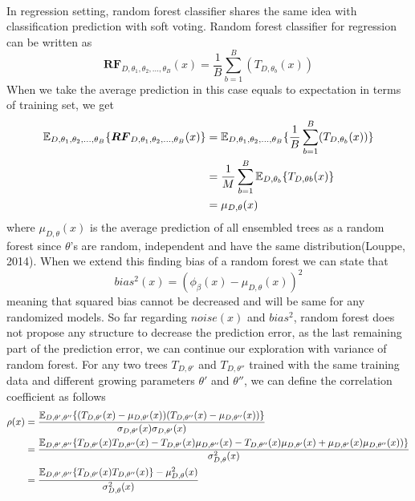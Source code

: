 \paragraph{}
In regression setting, random forest classifier shares the same idea with classification prediction with soft voting. Random forest classifier for regression can be written as
\begin{equation}
\boldsymbol{RF}_{D, \theta_{1},\theta_{2},..., \theta_{B}}(x) = \dfrac{1}{B}\sum_{b = 1}^{B}(T_{D,\theta_{b}}(x))
\end{equation}
When we take the average prediction in this case equals to expectation in terms of training set, we get
\begin{align}
\mathbb{E}_{D, \theta_{1}, \theta_{2},..., \theta_{B}}\{\boldsymbol{RF}_{D, \theta_{1},\theta_{2},..., \theta_{B}}(x) \} & = 
	\mathbb{E}_{D, \theta_{1}, \theta_{2},..., \theta_{B}}\{\dfrac{1}{B}\sum_{b = 1}^{B}(T_{D,\theta_{b}}(x))\} \notag \\
	& = \dfrac{1}{M}\sum_{b=1}^{B}\mathbb{E}_{D,\theta_{b}}\{T_{D, \theta{b}}(x)\}\notag \\
	& = \mu_{D,\theta}(x) 
\end{align}
where $\mu_{D,\theta}(x)$ is the average prediction of all ensembled trees as a random forest since $\theta$'s are random, independent
and have the same distribution(Louppe, 2014). When we extend this finding bias of a random forest we can state that 
\begin{equation}
bias^2(x) = (\phi_{\beta}(x) - \mu_{D,\theta}(x))^2
\end{equation}
meaning that squared bias cannot be decreased and will be same for any randomized models. So far regarding $noise(x)$ and $bias^2$, random forest does not propose any structure to decrease the prediction error, as the last remaining part of the prediction error, we can continue our exploration with variance of random forest. For any two trees $T_{D,\theta'}$ and $T_{D,\theta''}$ trained with the same training data and different growing parameters $\theta'$ and $\theta''$, we can define the correlation coefficient as follows
\begin{align}
\rho(x) & = \dfrac{\mathbb{E}_{D,\theta',\theta''}\{(T_{D,\theta'}(x) - \mu_{D,\theta'}(x))(T_{D,\theta''}(x) - \mu_{D,\theta''}(x))\} }					{\sigma_{D,\theta'}(x)\sigma_{D,\theta'}(x)}\notag \\
		& = \dfrac{\mathbb{E}_{D,\theta',\theta''}\{T_{D,\theta'}(x)T_{D,\theta''}(x) - T_{D,\theta'}(x)\mu_{D,\theta''}(x) - T_{D,								\theta''}(x)\mu_{D,\theta'}(x) + \mu_{D,\theta'}(x)\mu_{D,\theta''}(x))\} }
					{\sigma_{D,\theta}^2(x)} \notag \\
		& = \dfrac{\mathbb{E}_{D,\theta',\theta''}\{T_{D,\theta'}(x) T_{D,\theta''}(x)\} - \mu_{D,\theta}^2(x)}{\sigma_{D,\theta}^2(x)}
\end{align}



